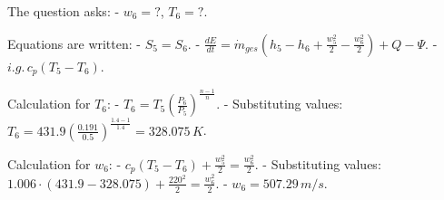 The question asks:  
- \( w_6 = ? \), \( T_6 = ? \).  

Equations are written:  
- \( S_5 = S_6 \).  
- \( \frac{dE}{dt} = \dot{m}_{ges} \left( h_5 - h_6 + \frac{w_5^2}{2} - \frac{w_6^2}{2} \right) + Q - \Psi \).  
- \( i.g. \, c_p (T_5 - T_6) \).  

Calculation for \( T_6 \):  
- \( T_6 = T_5 \left( \frac{P_6}{P_5} \right)^{\frac{n-1}{n}} \).  
- Substituting values: \( T_6 = 431.9 \left( \frac{0.191}{0.5} \right)^{\frac{1.4-1}{1.4}} = 328.075 \, K \).  

Calculation for \( w_6 \):  
- \( c_p (T_5 - T_6) + \frac{w_5^2}{2} = \frac{w_6^2}{2} \).  
- Substituting values: \( 1.006 \cdot (431.9 - 328.075) + \frac{220^2}{2} = \frac{w_6^2}{2} \).  
- \( w_6 = 507.29 \, m/s \).